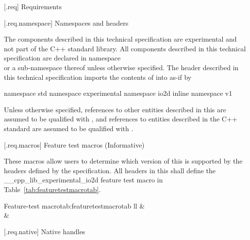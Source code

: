  [\iotwod.req] {Requirements}

 [\iotwod.req.namespace] {Namespaces and headers}

\pnum
The components described in this technical specification are experimental and 
not part of the C++ standard library. All components described in this 
technical specification are declared in namespace\\  or a sub-namespace thereof unless 
otherwise specified. The header described in this technical specification 
imports the contents of  into 
 as-if by

\pnum
\begin{codeblock}
namespace std {
  namespace experimental {
    namespace io2d {
      inline namespace v1 { }
    }
  }
}
\end{codeblock}

\pnum
Unless otherwise specified, references to other entities described in this \documenttypename{} are assumed to be qualified with , and references to entities
described in the C++ standard are assumed to be qualified with .

 [\iotwod.req.macros] {Feature test macros (Informative)}

\pnum
These macros allow users to determine which version of this \documenttypename is supported by the headers deﬁned by the speciﬁcation. All headers in this \documenttypename shall deﬁne the __cpp_lib_experimental_io2d feature test macro in Table~\ref{tab:featuretestmacrotab}.

\begin{floattable}{Feature-test macro}{tab:featuretestmacrotab}
 {ll}
 \topline
  &  \\
 \capsep
  &  \\
\end{floattable}


%
%
 [\iotwod.req.native] {Native handles}

